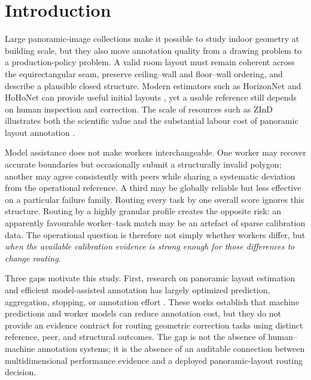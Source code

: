 \section{Introduction}
\label{sec:introduction}

Large panoramic-image collections make it possible to study indoor geometry at building scale, but they also move annotation quality from a drawing problem to a production-policy problem. A valid room layout must remain coherent across the equirectangular seam, preserve ceiling--wall and floor--wall ordering, and describe a plausible closed structure. Modern estimators such as HorizonNet and HoHoNet can provide useful initial layouts \cite{sun2019horizonnet,sun2021hohonet}, yet a usable reference still depends on human inspection and correction. The scale of resources such as ZInD illustrates both the scientific value and the substantial labour cost of panoramic layout annotation \cite{cruz2021zind}.

Model assistance does not make workers interchangeable. One worker may recover accurate boundaries but occasionally submit a structurally invalid polygon; another may agree consistently with peers while sharing a systematic deviation from the operational reference. A third may be globally reliable but less effective on a particular failure family. Routing every task by one overall score ignores this structure. Routing by a highly granular profile creates the opposite risk: an apparently favourable worker--task match may be an artefact of sparse calibration data. The operational question is therefore not simply whether workers differ, but \emph{when the available calibration evidence is strong enough for those differences to change routing}.

Three gaps motivate this study. First, research on panoramic layout estimation and efficient model-assisted annotation has largely optimized prediction, aggregation, stopping, or annotation effort \cite{sun2019horizonnet,sun2021hohonet,jiang2022lgtnet,branson2017lean,vanhorn2018leanmulticlass,liao2021goodpractices}. These works establish that machine predictions and worker models can reduce annotation cost, but they do not provide an evidence contract for routing geometric correction tasks using distinct reference, peer, and structural outcomes. The gap is not the absence of human--machine annotation systems; it is the absence of an auditable connection between multidimensional performance evidence and a deployed panoramic-layout routing decision.

